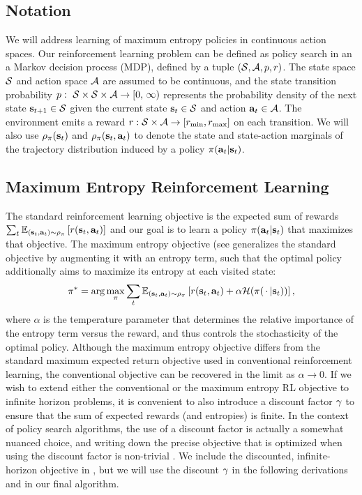 \subsection{Notation}
We will address learning of maximum entropy policies in continuous action spaces. Our reinforcement learning problem can be defined as policy search in an a Markov decision process (MDP), defined by a tuple $(\mathcal{S}, \mathcal{A}, p, r)$. The state space $\mathcal{S}$ and action space $\mathcal{A}$ are assumed to be continuous, and the state transition probability $p:\ \mathcal{S} \times \mathcal{S} \times \mathcal{A} \rightarrow [0,\, \infty)$ represents the probability density of the next state ${\mathbf{s}_{t+1}}\in\mathcal{S}$ given the current state ${\mathbf{s}_t}\in\mathcal{S}$ and action ${\mathbf{a}_t}\in\mathcal{A}$. The environment emits a reward $r: \mathcal{S} \times \mathcal{A} \rightarrow  [r_\mathrm{min},r_\mathrm{max}]$ on each transition. We will also use $\rho_\pi({\mathbf{s}_t})$ and $\rho_\pi({\mathbf{s}_t},{\mathbf{a}_t})$ to denote the state and state-action marginals of the trajectory distribution induced by a policy $\pi({\mathbf{a}_t}|{\mathbf{s}_t})$. 


\subsection{Maximum Entropy Reinforcement Learning}
The standard reinforcement learning objective is the expected sum of rewards $\sum_t \operatorname{\mathbb{E}}_{({\mathbf{s}_t},{\mathbf{a}_t})\sim\rho_\pi}\left[r({\mathbf{s}_t},{\mathbf{a}_t})\right]$ and our goal is to learn a policy $\pi({\mathbf{a}_t}|{\mathbf{s}_t})$ that maximizes that objective. 
 The maximum entropy objective (see \eg \cite{ziebart2010modeling} generalizes the standard objective by augmenting it with an entropy term, such that the optimal policy additionally aims to maximize its entropy at each visited state:
\begin{align}
\label{eq:sql:maxent_objective}
\pi^* = \arg\max_{\pi} \sum_{t} \operatorname{\mathbb{E}}_{({\mathbf{s}_t}, {\mathbf{a}_t}) \sim \rho_\pi}\left[r({\mathbf{s}_t},{\mathbf{a}_t}) + \alpha\mathcal{H}(\pi({\,\cdot\,}|{\mathbf{s}_t}))\right],
\end{align}
where $\alpha$ is the temperature parameter that determines the relative importance of the entropy term versus the reward, and thus controls the stochasticity of the optimal policy. Although the maximum entropy objective differs from the standard maximum expected return objective used in conventional reinforcement learning, the conventional objective can be recovered in the limit as $\alpha \rightarrow 0$. If we wish to extend either the conventional or the maximum entropy RL objective to infinite horizon problems, it is convenient to also introduce a discount factor $\gamma$ to ensure that the sum of expected rewards (and entropies) is finite. In the context of policy search algorithms, the use of a discount factor is actually a somewhat nuanced choice, and writing down the precise objective that is optimized when using the discount factor is non-trivial \cite{thomas2014bias}. We include the discounted, infinite-horizon objective in , but we will use the discount $\gamma$ in the following derivations and in our final algorithm.



